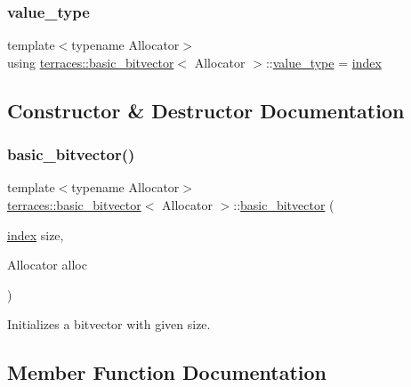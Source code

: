 \subsubsection{\texorpdfstring{value\+\_\+type}{value\_type}}
{\footnotesize\ttfamily template$<$typename Allocator$>$ \\
using \hyperlink{classterraces_1_1basic__bitvector}{terraces\+::basic\+\_\+bitvector}$<$ Allocator $>$\+::\hyperlink{classterraces_1_1basic__bitvector_ad076eceb68c15a18925cd409e6eaac11}{value\+\_\+type} =  \hyperlink{namespaceterraces_adbc33ccb543d1634e96d0eb02e472c77}{index}}



\subsection{Constructor \& Destructor Documentation}
\mbox{\label{classterraces_1_1basic__bitvector_aeb3cce162b70f7bcbbf51eefad7acce2}} 
\subsubsection{\texorpdfstring{basic\+\_\+bitvector()}{basic\_bitvector()}}
{\footnotesize\ttfamily template$<$typename Allocator$>$ \\
\hyperlink{classterraces_1_1basic__bitvector}{terraces\+::basic\+\_\+bitvector}$<$ Allocator $>$\+::\hyperlink{classterraces_1_1basic__bitvector}{basic\+\_\+bitvector} (\begin{DoxyParamCaption}\item[{\hyperlink{namespaceterraces_adbc33ccb543d1634e96d0eb02e472c77}{index}}]{size,  }\item[{Allocator}]{alloc }\end{DoxyParamCaption})\hspace{0.3cm}{\ttfamily [inline]}}

Initializes a bitvector with given size. 

\subsection{Member Function Documentation}
\mbox{\label{classterraces_1_1basic__bitvector_ad5a0a0f50c0f41c8f0f10ea74cd272fa}} 
